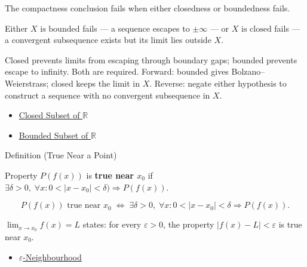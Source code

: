 \begin{remark*}
The compactness conclusion fails when either closedness or boundedness fails.
\end{remark*}

\begin{remark*}
Either $X\text{ is bounded}$ fails --- a sequence escapes to
$\pm\infty$ --- or $X\text{ is closed}$ fails --- a convergent
subsequence exists but its limit lies outside $X$.
\end{remark*}

\begin{remark*}[Interpretation]
Closed prevents limits from escaping through boundary gaps; bounded
prevents escape to infinity. Both are required. Forward: bounded
gives Bolzano--Weierstrass; closed keeps the limit in $X$. Reverse:
negate either hypothesis to construct a sequence with no convergent
subsequence in $X$.
\end{remark*}

\begin{dependencies}
\begin{itemize}
  \item \hyperref[def:closed-set-r]{Closed Subset of $\mathbb{R}$}
  \item \hyperref[def:bounded-set-r]{Bounded Subset of $\mathbb{R}$}
\end{itemize}
\end{dependencies}


\begin{definitionbox}{Definition (True Near a Point)}
\begin{definition}
\label{def:true-near}
Property $P(f(x))$ is \textbf{true near $x_0$} if
$\exists\delta>0,\;\forall x : 0<|x-x_0|<
\delta) \Rightarrow P(f(x))$.
\end{definition}
\end{definitionbox}

\begin{remark*}
\[
  P(f(x))\text{ true near }x_0
  \;\iff\;
  \exists\delta>0,\;\forall x :
  0 < |x-x_0| < \delta \Rightarrow P(f(x)).
\]
\end{remark*}

\begin{remark*}[Interpretation]
$\lim_{x\to x_0}f(x)=L$ states: for every
$\varepsilon>0$, the property $|f(x)-L|<\varepsilon$ is true near $x_0$.
\end{remark*}

\begin{dependencies}
\begin{itemize}
  \item \hyperref[def:epsilon-neighbourhood]{$\varepsilon$-Neighbourhood}
\end{itemize}
\end{dependencies}
